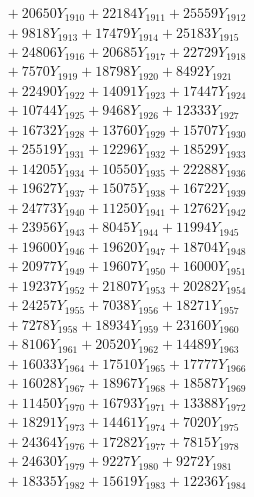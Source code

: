 \documentclass[a4paper,10pt]{article}
\begin{document}
{\begin{align}
&\;  + 20650 Y_{1910} + 22184 Y_{1911} + 25559 Y_{1912} \\[0.3ex]
&\;  + 9818 Y_{1913} + 17479 Y_{1914} + 25183 Y_{1915} \\[0.3ex]
&\;  + 24806 Y_{1916} + 20685 Y_{1917} + 22729 Y_{1918} \\[0.5ex]\allowbreak
&\;  + 7570 Y_{1919} + 18798 Y_{1920} + 8492 Y_{1921} \\[0.3ex]
&\;  + 22490 Y_{1922} + 14091 Y_{1923} + 17447 Y_{1924} \\[0.3ex]
&\;  + 10744 Y_{1925} + 9468 Y_{1926} + 12333 Y_{1927} \\[0.3ex]
&\;  + 16732 Y_{1928} + 13760 Y_{1929} + 15707 Y_{1930} \\[0.3ex]
&\;  + 25519 Y_{1931} + 12296 Y_{1932} + 18529 Y_{1933} \\[0.3ex]
&\;  + 14205 Y_{1934} + 10550 Y_{1935} + 22288 Y_{1936} \\[0.3ex]
&\;  + 19627 Y_{1937} + 15075 Y_{1938} + 16722 Y_{1939} \\[0.3ex]
&\;  + 24773 Y_{1940} + 11250 Y_{1941} + 12762 Y_{1942} \\[0.3ex]
&\;  + 23956 Y_{1943} + 8045 Y_{1944} + 11994 Y_{1945} \\[0.3ex]
&\;  + 19600 Y_{1946} + 19620 Y_{1947} + 18704 Y_{1948} \\[0.5ex]\allowbreak
&\;  + 20977 Y_{1949} + 19607 Y_{1950} + 16000 Y_{1951} \\[0.3ex]
&\;  + 19237 Y_{1952} + 21807 Y_{1953} + 20282 Y_{1954} \\[0.3ex]
&\;  + 24257 Y_{1955} + 7038 Y_{1956} + 18271 Y_{1957} \\[0.3ex]
&\;  + 7278 Y_{1958} + 18934 Y_{1959} + 23160 Y_{1960} \\[0.3ex]
&\;  + 8106 Y_{1961} + 20520 Y_{1962} + 14489 Y_{1963} \\[0.3ex]
&\;  + 16033 Y_{1964} + 17510 Y_{1965} + 17777 Y_{1966} \\[0.3ex]
&\;  + 16028 Y_{1967} + 18967 Y_{1968} + 18587 Y_{1969} \\[0.3ex]
&\;  + 11450 Y_{1970} + 16793 Y_{1971} + 13388 Y_{1972} \\[0.3ex]
&\;  + 18291 Y_{1973} + 14461 Y_{1974} + 7020 Y_{1975} \\[0.3ex]
&\;  + 24364 Y_{1976} + 17282 Y_{1977} + 7815 Y_{1978} \\[0.5ex]\allowbreak
&\;  + 24630 Y_{1979} + 9227 Y_{1980} + 9272 Y_{1981} \\[0.3ex]
&\;  + 18335 Y_{1982} + 15619 Y_{1983} + 12236 Y_{1984} \\[0.3ex]

\end{align}}
\end{document}

